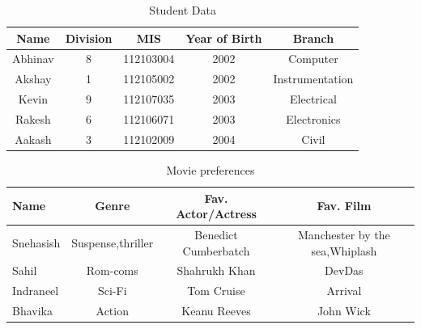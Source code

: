 \documentclass{article}
\begin{document}
\begin{table}[h!]
\begin{center}
\caption{Student Data}
\label{tab:Table1}
\vspace{5mm}
\begin{tabular}{|c|c|c|c|c|}
\textbf{Name} & \textbf{Division} & \textbf{MIS} & \textbf{Year of Birth} & \textbf{Branch}\\
\hline
Abhinav & 8 & 112103004 & 2002 & Computer\\
Akshay & 1 & 112105002 & 2002 & Instrumentation\\
Kevin & 9 & 112107035 & 2003 & Electrical\\
Rakesh & 6 & 112106071 & 2003 & Electronics\\
Aakash & 3 & 112102009 & 2004 & Civil\\
\end{tabular}
\end{center}
\end{table}
\vspace{30mm}
\begin{table}[h!]
\begin{center}
\caption{Movie preferences}
\label{tab:Table2}
\vspace{5mm}
\begin{tabular}{|l|c|c|c|}
\hline
\textbf{Name} & \textbf{Genre} & \textbf{Fav. Actor/Actress} & \textbf{Fav. Film}\\
\hline
Snehasish & Suspense,thriller & Benedict Cumberbatch & Manchester by the sea,Whiplash\\
\hline
Sahil & Rom-coms & Shahrukh Khan & DevDas\\
\hline
Indraneel & Sci-Fi & Tom Cruise & Arrival\\
\hline
Bhavika & Action & Keanu Reeves & John Wick\\
\hline




\end{tabular}
\end{center}
\end{table}
\vspace{50mm}
\end{document}
